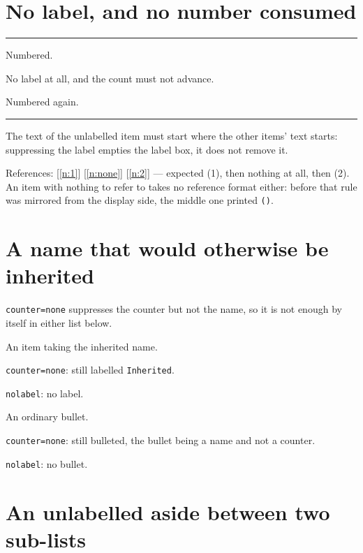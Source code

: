 \documentclass{article}
\begin{document}
\section{No label, and no number consumed}

\noindent\rule{\textwidth}{0.3pt}
\begin{prop}
  \item Numbered. \label{n:1}
  \item[style=nolabel] No label at all, and the count must not advance.
    \label{n:none}
  \item Numbered again. \label{n:2}
\end{prop}
\noindent\rule{\textwidth}{0.3pt}

The text of the unlabelled item must start where the other items' text starts:
suppressing the label empties the label box, it does not remove it.

References: [\ref{n:1}] [\ref{n:none}] [\ref{n:2}] --- expected (1), then
nothing at all, then (2).  An item with nothing to refer to takes no reference
format either: before that rule was mirrored from the display side, the middle
one printed \texttt{()}.

\section{A name that would otherwise be inherited}

\texttt{counter=none} suppresses the counter but not the name, so it is not
enough by itself in either list below.

\begin{prop}[name=Inherited]
  \item An item taking the inherited name.
  \item[counter=none] \texttt{counter=none}: still labelled \texttt{Inherited}.
  \item[style=nolabel] \texttt{nolabel}: no label.
\end{prop}

\begin{prop}[style=bullet]
  \item An ordinary bullet.
  \item[counter=none] \texttt{counter=none}: still bulleted, the bullet being
    a name and not a counter.
  \item[style=nolabel] \texttt{nolabel}: no bullet.
\end{prop}

\section{An unlabelled aside between two sub-lists}
\end{document}
